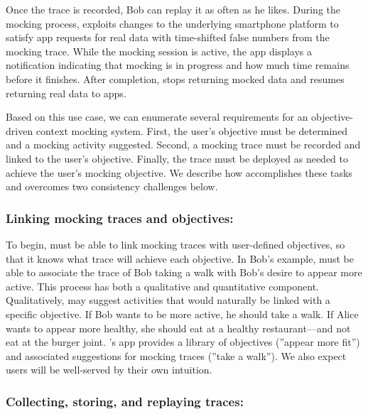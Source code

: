 Once the trace is recorded, Bob can replay it as often as he likes. During the
mocking process, \PocketMocker{} exploits changes to the underlying
smartphone platform to satisfy app requests for real data with time-shifted
false numbers from the mocking trace. While the mocking session is active, the
\PocketMocker{} app displays a notification indicating that mocking is in
progress and how much time remains before it finishes. After completion,
\PocketMocker{} stops returning mocked data and resumes returning real data to
apps.

Based on this use case, we can enumerate several requirements for an
objective-driven context mocking system. First, the user's objective must be
determined and a mocking activity suggested. Second, a mocking trace must be
recorded and linked to the user's objective. Finally, the trace must be
deployed as needed to achieve the user's mocking objective. We describe how
\PocketMocker{} accomplishes these tasks and overcomes two consistency
challenges below.

\subsubsection{Linking mocking traces and objectives:\space}

To begin, \PocketMocker{} must be able to link mocking traces with
user-defined objectives, so that it knows what trace will achieve each
objective. In Bob's example, \PocketMocker{} must be able to associate the
trace of Bob taking a walk with Bob's desire to appear more active. This
process has both a qualitative and quantitative component. Qualitatively,
\PocketMocker{} may suggest activities that would naturally be linked with a
specific objective. If Bob wants to be more active, he should take a walk. If
Alice wants to appear more healthy, she should eat at a healthy
restaurant---and not eat at the burger joint. \PocketMocker{}'s app
provides a library of objectives (''appear more fit'') and associated
suggestions for mocking traces (''take a walk''). We also expect users will
be well-served by their own intuition.

\subsubsection{Collecting, storing, and replaying traces:\space}

